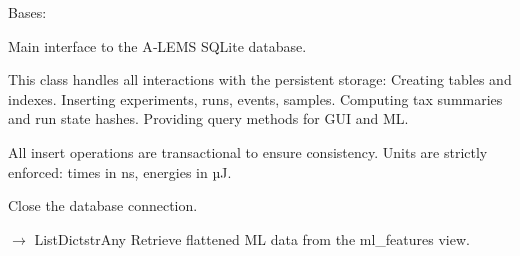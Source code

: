 \documentclass[letterpaper,10pt,english]{sphinxmanual}
\begin{document}
\begin{fulllineitems}
\label{\detokenize{core.database.manager_oldversion:core.database.manager_oldversion.DatabaseManager}}
\pysigstartsignatures
\pysiglinewithargsret
{}
{}
{}
\pysigstopsignatures
\sphinxAtStartPar
Bases: 

\sphinxAtStartPar
Main interface to the A‑LEMS SQLite database.

\sphinxAtStartPar
This class handles all interactions with the persistent storage:
\sphinxhyphen{} Creating tables and indexes.
\sphinxhyphen{} Inserting experiments, runs, events, samples.
\sphinxhyphen{} Computing tax summaries and run state hashes.
\sphinxhyphen{} Providing query methods for GUI and ML.

\sphinxAtStartPar
All insert operations are transactional to ensure consistency.
Units are strictly enforced: times in ns, energies in µJ.

\begin{fulllineitems}
\label{\detokenize{core.database.manager_oldversion:core.database.manager_oldversion.DatabaseManager.close}}
\pysigstartsignatures
\pysiglinewithargsret
{}
{}
{}
\pysigstopsignatures
\sphinxAtStartPar
Close the database connection.

\end{fulllineitems}


\begin{fulllineitems}
\label{\detokenize{core.database.manager_oldversion:core.database.manager_oldversion.DatabaseManager.get_ml_data}}
\pysigstartsignatures
\pysiglinewithargsret
{}
{}
{{ $\rightarrow$ List\DUrole{p}{{[}}Dict\DUrole{p}{{[}}strAny\DUrole{p}{{]}}\DUrole{p}{{]}}}}
\pysigstopsignatures
\sphinxAtStartPar
Retrieve flattened ML data from the ml\_features view.


\end{fulllineitems}
\end{fulllineitems}
\end{document}
